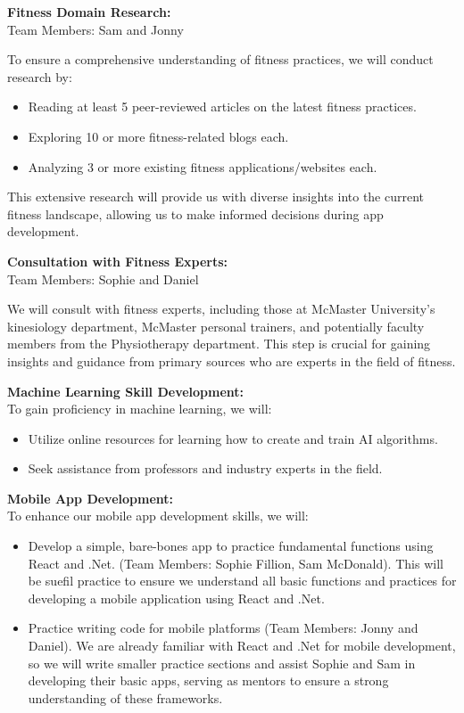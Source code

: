 \documentclass[12pt]{article}
\begin{document}
\begin{enumerate}
\textbf{Fitness Domain Research:}\\
Team Members: Sam and Jonny

To ensure a comprehensive understanding of fitness practices, we will conduct research by:
\begin{itemize}
    \item Reading at least 5 peer-reviewed articles on the latest fitness practices.
    \item Exploring 10 or more fitness-related blogs each.
    \item Analyzing 3 or more existing fitness applications/websites each.
\end{itemize}

This extensive research will provide us with diverse insights into the current fitness landscape, allowing us to make informed decisions during app development.

\textbf{Consultation with Fitness Experts:}\\
Team Members: Sophie and Daniel

We will consult with fitness experts, including those at McMaster University's kinesiology department, McMaster personal trainers, and potentially faculty members from the Physiotherapy department. This step is crucial for gaining insights and guidance from primary sources who are experts in the field of fitness.

\textbf{Machine Learning Skill Development:}\\
To gain proficiency in machine learning, we will:
\begin{itemize}
    \item Utilize online resources for learning how to create and train AI algorithms.
    \item Seek assistance from professors and industry experts in the field.
\end{itemize}

\textbf{Mobile App Development:}\\

To enhance our mobile app development skills, we will:
\begin{itemize}
    \item Develop a simple, bare-bones app to practice fundamental functions using React and .Net. (Team Members: Sophie Fillion, Sam McDonald). This will be suefil practice to ensure we understand all basic functions and practices for developing a mobile application using React and .Net. 
    \item Practice writing code for mobile platforms (Team Members: Jonny and Daniel). We are already familiar with React and .Net for mobile development, so we will write smaller practice sections and assist Sophie and Sam in developing their basic apps, serving as mentors to ensure a strong understanding of these frameworks.
\end{itemize}



\end{enumerate}
\end{document}
